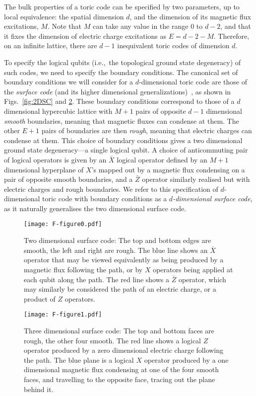 \documentclass[pra,twocolumn,a4paper,nofootinbib]{revtex4-1}
\begin{document}
The bulk properties of a toric code can be specified by two parameters, up to local equivalence: the spatial dimension $d$, and the dimension of its magnetic flux excitations, $M$.  Note that $M$ can take any value in the range $0$ to $d-2$, and that it fixes the dimension of electric charge excitations as $E=d-2-M$.  Therefore, on an infinite lattice, there are $d-1$ inequivalent toric codes of dimension $d$.  

To specify the logical qubits (i.e.,~the topological ground state degeneracy) of such codes, we need to specify the boundary conditions.  The canonical set of boundary conditions we will consider for a $d$-dimensional toric code are those of the \emph{surface code} (and its higher dimensional generalizations)~\cite{SC}, as shown in Figs.~\ref{fig:2DSC} and \ref{fig:3DSC}.  These boundary conditions correspond to those of a $d$ dimensional hypercubic lattice with $M+1$ pairs of opposite $d-1$ dimensional \emph{smooth} boundaries, meaning that magnetic fluxes can condense at them. The other $E+1$ pairs of boundaries are then \emph{rough}, meaning that electric charges can condense at them.  This choice of boundary conditions gives a two dimensional ground state degeneracy---a single logical qubit.  A choice of anticommuting pair of logical operators is given by an $\bar{X}$ logical operator defined by an $M+1$ dimensional hyperplane of $X$'s mapped out by a magnetic flux condensing on a pair of opposite smooth boundaries, and a $\bar{Z}$ operator similarly realised but with electric charges and rough boundaries.  We refer to this specification of $d$-dimensional toric code with boundary conditions as a \emph{$d$-dimensional surface code}, as it naturally generalises the two dimensional surface code.

\begin{figure}
\centering
\texttt{[image: F-figure0.pdf]}
\caption{Two dimensional surface code: The top and bottom edges are smooth, the left and right are rough. The blue line shows an $\bar{X}$ operator that may be viewed equivalently as being produced by a magnetic flux following the path, or by $X$ operators being applied at each qubit along the path. The red line shows a $\bar{Z}$ operator, which may similarly be considered the path of an electric charge, or a product of $Z$ operators. \label{fig:2DSC}}
\label{fig:SC}
\end{figure}

\begin{figure}
\centering
\texttt{[image: F-figure1.pdf]}
\caption{Three dimensional surface code: The top and bottom faces are rough, the other four smooth. The red line shows a logical $Z$ operator produced by a zero dimensional electric charge following the path. The blue plane is a logical $X$ operator produced by a one dimensional magnetic flux condensing at one of the four smooth faces, and travelling to the opposite face, tracing out the plane behind it. \label{fig:3DSC}}
\end{figure}
\end{document}
